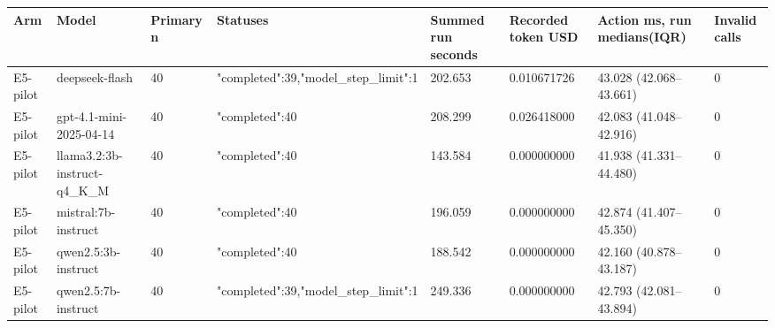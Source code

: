\begin{tabular}{llllllll}
\hline
Arm & Model & Primary n & Statuses & Summed run seconds & Recorded token USD & Action ms, run medians(IQR) & Invalid calls \\
\hline
E5-pilot & deepseek-flash & 40 & {"completed":39,"model\_step\_limit":1} & 202.653 & 0.010671726 & 43.028 (42.068--43.661) & 0 \\
E5-pilot & gpt-4.1-mini-2025-04-14 & 40 & {"completed":40} & 208.299 & 0.026418000 & 42.083 (41.048--42.916) & 0 \\
E5-pilot & llama3.2:3b-instruct-q4\_K\_M & 40 & {"completed":40} & 143.584 & 0.000000000 & 41.938 (41.331--44.480) & 0 \\
E5-pilot & mistral:7b-instruct & 40 & {"completed":40} & 196.059 & 0.000000000 & 42.874 (41.407--45.350) & 0 \\
E5-pilot & qwen2.5:3b-instruct & 40 & {"completed":40} & 188.542 & 0.000000000 & 42.160 (40.878--43.187) & 0 \\
E5-pilot & qwen2.5:7b-instruct & 40 & {"completed":39,"model\_step\_limit":1} & 249.336 & 0.000000000 & 42.793 (42.081--43.894) & 0 \\
\hline
\end{tabular}

